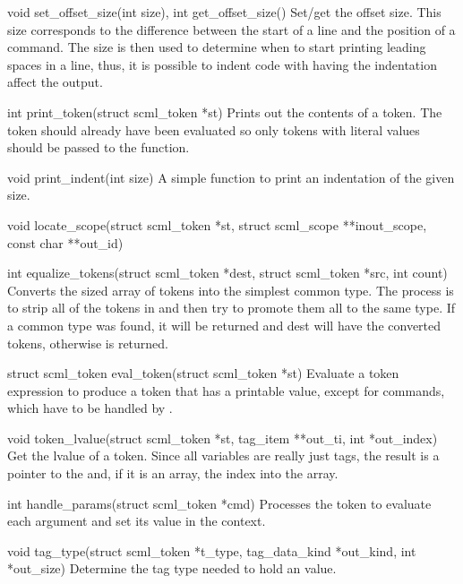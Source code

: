 \begin{cprototypelist}
  \item[void set_offset_size(int size), int get_offset_size()] Set/get the
  offset size.  This size corresponds to the difference between the start of a
  line and the position of a  command.  The size is then used
  to determine when to start printing leading spaces in a line, thus, it is
  possible to indent \SCML{} code with having the indentation affect the
  output.

  \item[int print_token(struct scml_token *st)] Prints out the
  contents of a token.  The token should already have been evaluated so only
  tokens with literal values should be passed to the function.

  \item[void print_indent(int size)] A simple function to print an indentation
  of the given size.

  \item[void locate_scope(struct scml_token *st, struct scml_scope
  **inout_scope, const char **out_id)]

  \item[int equalize_tokens(struct scml_token *dest, struct
  scml_token *src, int count)] Converts the  sized array of
  tokens into the simplest common type.  The process is to strip all of the
  tokens in  and then try to promote them all to the same
  type.  If a common type was found, it will be returned and dest will have the
  converted tokens, otherwise  is returned.

  \item[struct scml_token eval_token(struct scml_token *st)]
  Evaluate a token expression to produce a token that has a printable value,
  except for commands, which have to be handled by .

  \item[void token_lvalue(struct scml_token *st, tag_item **out_ti,
  int *out_index)] Get the lvalue of a token.  Since all variables are really
  just tags, the result is a pointer to the  and, if it is an
  array, the index into the array.

  \item[int handle_params(struct scml_token *cmd)] Processes the
   token to evaluate each argument and set its
  value in the context.

  \item[void tag_type(struct scml_token *t_type, tag_data_kind
  *out_kind, int *out_size)] Determine the \PRESC{} tag type needed to hold an
  \SCML{} value.


\end{cprototypelist}
